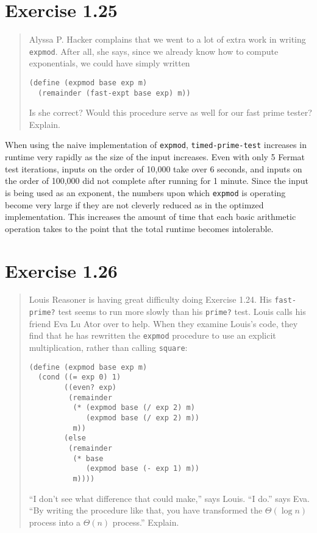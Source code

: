 \documentclass{article}
\begin{document}
\section{Exercise 1.25}
\begin{quote}
    Alyssa P. Hacker complains that we went to a lot of extra work in writing
    \texttt{expmod}. After all, she says, since we already know how to compute
    exponentials, we could have simply written
    \begin{lstlisting}
(define (expmod base exp m)
  (remainder (fast-expt base exp) m))
    \end{lstlisting}
    Is she correct? Would this procedure serve as well for our fast prime
    tester? Explain.
\end{quote}

When using the naive implementation of \texttt{expmod},
\texttt{timed-prime-test} increases in runtime very rapidly as the size of the
input increases. Even with only 5 Fermat test iterations, inputs on the order of
10,000 take over 6 seconds, and inputs on the order of 100,000 did not complete
after running for 1 minute. Since the input is being used as an exponent, the
numbers upon which \texttt{expmod} is operating become very large if they are
not cleverly reduced as in the optimzed implementation. This increases the
amount of time that each basic arithmetic operation takes to the point that the
total runtime becomes intolerable.

\section{Exercise 1.26}
\begin{quote}
    Louis Reasoner is having great difficulty doing Exercise 1.24. His
    \texttt{fast-prime?} test seems to run more slowly than his \texttt{prime?}
    test. Louis calls his friend Eva Lu Ator over to help. When they examine
    Louis's code, they find that he has rewritten the \texttt{expmod} procedure
    to use an explicit multiplication, rather than calling \texttt{square}:
    \begin{lstlisting}
(define (expmod base exp m)
  (cond ((= exp 0) 1)
        ((even? exp)
         (remainder
          (* (expmod base (/ exp 2) m)
             (expmod base (/ exp 2) m))
          m))
        (else
         (remainder
          (* base
             (expmod base (- exp 1) m))
          m))))
    \end{lstlisting}
``I don’t see what difference that could make,'' says Louis. ``I do.'' says Eva.
``By writing the procedure like that, you have transformed the $\Theta(\log{n})$
process into a $\Theta(n)$ process.'' Explain.
\end{quote}
\end{document}
